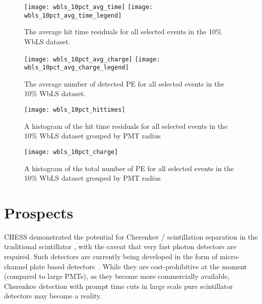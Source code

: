 \begin{figure}
\centering
\texttt{[image: wbls\_10pct\_avg\_time]}
\texttt{[image: wbls\_10pct\_avg\_time\_legend]}
\caption{\label{fig:wbls10pct_avg_time}The average hit time residuals for all selected events in the 10\% WbLS dataset.}
\end{figure}

\begin{figure}
\centering
\texttt{[image: wbls\_10pct\_avg\_charge]}
\texttt{[image: wbls\_10pct\_avg\_charge\_legend]}
\caption{\label{fig:wbls10pct_avg_charge}The average number of detected PE for all selected events in the 10\% WbLS dataset.}
\end{figure}

\begin{figure}
\centering
\texttt{[image: wbls\_10pct\_hittimes]}
\caption{\label{fig:wbls10pct_tresid}A histogram of the hit time residuals for all selected events in the 10\% WbLS dataset grouped by PMT radius}
\end{figure}

\begin{figure}
\centering
\texttt{[image: wbls\_10pct\_charge]}
\caption{\label{fig:wbls10pct_totalq}A histogram of the total number of PE for all selected events in the 10\% WbLS dataset grouped by PMT radius}
\end{figure}

\section{Prospects}

CHESS demonstrated the potential for Cherenkov / scintillation separation in the traditional scintillator {\labppo}, with the caveat that very fast photon detectors are required.
Such detectors are currently being developed in the form of micro-channel plate based detectors~\cite{lappd,lappd2}.
While they are cost-prohibitive at the moment (compared to large PMTs), as they become more commercially available, Cherenkov detection with prompt time cuts in large scale pure scintillator detectors may become a reality.

